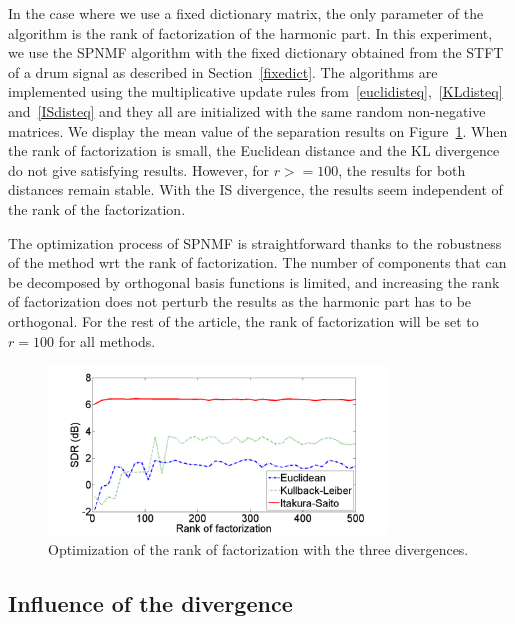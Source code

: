 In the case where we use a fixed dictionary matrix, the only parameter of the algorithm is the rank of factorization of the harmonic part. In this experiment, we use the SPNMF algorithm with the fixed dictionary obtained from the STFT of a drum signal as described in Section~\ref{fixedict}. The algorithms are implemented using the multiplicative update rules from~\ref{euclidisteq},~\ref{KLdisteq} and~\ref{ISdisteq} and they all are  initialized with the same random non-negative matrices. 
We display the mean value of the separation results on Figure~\ref{RankOfFact}. When the rank of factorization is small, the Euclidean distance and the KL divergence do not give satisfying results. However, for $r>=100$, the results for both distances remain stable. With the IS divergence, the results seem independent of the rank of the factorization.

The optimization process of SPNMF is straightforward thanks to the robustness of the method wrt the rank of factorization. The number of components that can be decomposed by orthogonal basis functions is limited, and increasing the rank of factorization does not perturb the results as the harmonic part has to be orthogonal. For the rest of the article, the rank of factorization will be set to $r=100$ for all methods.



\begin{figure}[t]

  \centering 
  \includegraphics[width=9cm]{fig/RankOfFact}
  \caption{\label{RankOfFact} Optimization of the rank of factorization with the three divergences.}
  
\end{figure}




\subsection{Influence of the divergence}
\label{setup:divergence}

